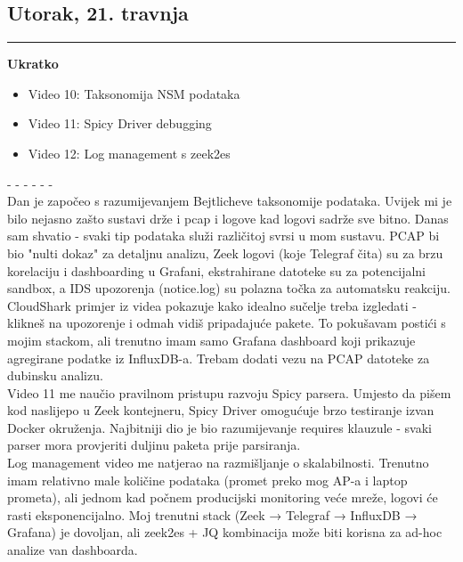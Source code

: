 \documentclass[12pt, a4paper]{article}
\newcommand{\dan}[1]{
    \subsection*{#1}
    \vspace{-0.5em} 
    \hrule \vspace{0.5em} 
}
\begin{document}
\dan{Utorak, 21. travnja}
\textbf{Ukratko}
\begin{itemize}
    \item Video 10: Taksonomija NSM podataka
    \item Video 11: Spicy Driver debugging
    \item Video 12: Log management s zeek2es
\end{itemize}
- - - - - - \\
Dan je započeo s razumijevanjem Bejtlicheve taksonomije podataka. Uvijek mi je bilo nejasno zašto sustavi drže i pcap i logove kad 
logovi sadrže sve bitno. Danas sam shvatio - svaki tip podataka služi različitoj svrsi u mom sustavu. PCAP bi bio "nulti dokaz" za 
detaljnu analizu, Zeek logovi (koje Telegraf čita) su za brzu korelaciju i dashboarding u Grafani, ekstrahirane datoteke su za 
potencijalni sandbox, a IDS upozorenja (notice.log) su polazna točka za automatsku reakciju.
\\
CloudShark primjer iz videa pokazuje kako idealno sučelje treba izgledati - klikneš na upozorenje i odmah vidiš pripadajuće pakete. 
To pokušavam postići s mojim stackom, ali trenutno imam samo Grafana dashboard koji prikazuje agregirane podatke iz InfluxDB-a. 
Trebam dodati vezu na PCAP datoteke za dubinsku analizu.
\\
Video 11 me naučio pravilnom pristupu razvoju Spicy parsera. Umjesto da pišem kod naslijepo u Zeek kontejneru, Spicy Driver omogućuje 
brzo testiranje izvan Docker okruženja. Najbitniji dio je bio razumijevanje requires klauzule - svaki parser mora provjeriti duljinu 
paketa prije parsiranja.
\\
Log management video me natjerao na razmišljanje o skalabilnosti. Trenutno imam relativno male količine podataka (promet preko mog 
AP-a i laptop prometa), ali jednom kad počnem producijski monitoring veće mreže, logovi će rasti eksponencijalno. Moj trenutni stack 
(Zeek → Telegraf → InfluxDB → Grafana) je dovoljan, ali zeek2es + JQ kombinacija može biti korisna za ad-hoc analize van dashboarda.
\end{document}
